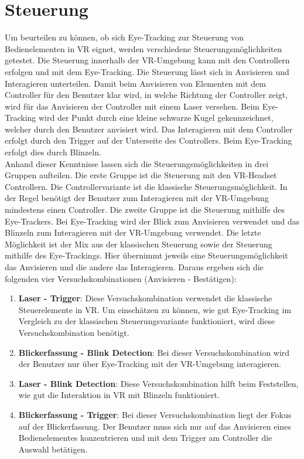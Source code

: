 
\section{Steuerung}
Um beurteilen zu können, ob sich Eye-Tracking zur Steuerung von Bedienelementen in \ac{VR} eignet, werden verschiedene Steuerungsmöglichkeiten getestet. Die Steuerung innerhalb der \ac{VR}-Umgebung kann mit den Controllern erfolgen und mit dem Eye-Tracking. Die Steuerung lässt sich in Anvisieren und Interagieren unterteilen. Damit beim Anvisieren von Elementen mit dem Controller für den Benutzer klar wird, in welche Richtung der Controller zeigt, wird für das Anvisieren der Controller mit einem Laser versehen. Beim Eye-Tracking wird der Punkt durch eine kleine schwarze Kugel gekennzeichnet, welcher durch den Benutzer anvisiert wird. Das Interagieren mit dem Controller erfolgt durch den Trigger auf der Unterseite des Controllers. Beim Eye-Tracking erfolgt dies durch Blinzeln.\\
Anhand dieser Kenntnisse lassen sich die Steuerungsmöglichkeiten in drei Gruppen aufteilen. Die erste Gruppe ist die Steuerung mit den \ac{VR}-Headset Controllern. Die Controllervariante ist die klassische Steuerungsmöglichkeit. In der Regel benötigt der Benutzer zum Interagieren mit der \ac{VR}-Umgebung mindestens einen Controller. Die zweite Gruppe ist die Steuerung mithilfe des Eye-Trackers. Bei Eye-Tracking wird der Blick zum Anvisieren verwendet und das Blinzeln zum Interagieren mit der \ac{VR}-Umgebung verwendet. Die letzte Möglichkeit ist der Mix aus der klassischen Steuerung sowie der Steuerung mithilfe des Eye-Trackings. Hier übernimmt jeweils eine Steuerungsmöglichkeit das Anvisieren und die andere das Interagieren. Daraus ergeben sich die folgenden vier Versuchskombinationen (Anvisieren - Bestätigen):

\begin{enumerate}
	\item \textbf{Laser - Trigger}: Diese Versuchskombination verwendet die klassische Steuerelemente in \ac{VR}. Um einschätzen zu können, wie gut Eye-Tracking im Vergleich zu der klassischen Steuerungsvariante funktioniert, wird diese Versuchskombination benötigt. 
	\item \textbf{Blickerfassung - Blink Detection}: Bei dieser Versuchskombination wird der Benutzer nur über Eye-Tracking mit der \ac{VR}-Umgebung interagieren. 
	\item \textbf{Laser - Blink Detection}: Diese Versuchskombination hilft beim Feststellen, wie gut die Interaktion in \ac{VR} mit Blinzeln funktioniert. 
	\item \textbf{Blickerfassung - Trigger}: Bei dieser Versuchskombination liegt der Fokus auf der Blickerfassung. Der Benutzer muss sich nur auf das Anvisieren eines Bedienelementes konzentrieren und mit dem Trigger am Controller die Auswahl betätigen.
\end{enumerate}

